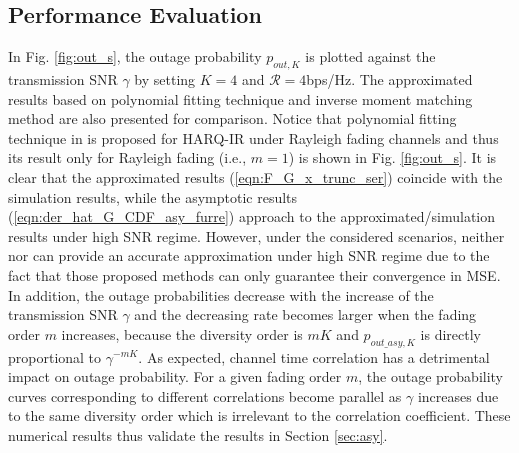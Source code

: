 \documentclass[12pt,onecolumn,draftcls]{IEEEtran}
\begin{document}
\subsection{Performance Evaluation}
In Fig. \ref{fig:out_s}, the outage probability $p_{out,K}$ is plotted against the transmission SNR $\gamma$ by setting $K=4$ and $\mathcal R=4$bps/Hz. The approximated results based on  polynomial fitting technique \cite{shi2015analysis} and inverse moment matching method \cite{shi2016inverse} are also presented for comparison. Notice that polynomial fitting technique in \cite{shi2015analysis} is proposed for HARQ-IR under Rayleigh fading channels and thus its result only for Rayleigh fading (i.e., $m=1$) is shown in Fig. \ref{fig:out_s}. It is clear that the approximated results (\ref{eqn:F_G_x_trunc_ser}) coincide with the simulation results, while the asymptotic results (\ref{eqn:der_hat_G_CDF_asy_furre}) approach to the approximated/simulation results under high SNR regime. However, under the considered scenarios, neither \cite{shi2015analysis} nor \cite{shi2016inverse} can provide an accurate approximation under high SNR regime due to the fact that those proposed methods can only guarantee their convergence in MSE. In addition, the outage probabilities decrease with the increase of the transmission SNR $\gamma$ and the decreasing rate becomes larger when the fading order $m$ increases, because the diversity order is $mK$ and $p_{out\_asy,K}$ is directly proportional to $\gamma^{-mK}$. As expected, channel time correlation has a detrimental impact on outage probability. For a given fading order $m$, the outage probability curves corresponding to different correlations become parallel as $\gamma$ increases due to the same diversity order which is irrelevant to the correlation coefficient. These numerical results thus validate the results in Section \ref{sec:asy}.

\end{document}
